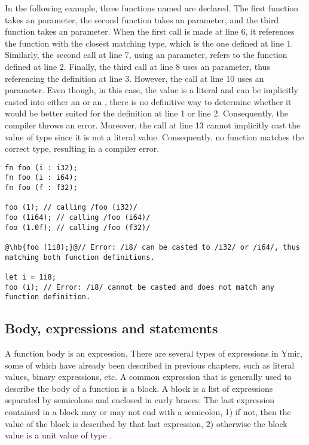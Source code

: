 In the following example, three functions named  are declared. The
first function takes an  parameter, the second function takes an
 parameter, and the third function takes an  parameter.
When the first call is made at line 6, it references the function with the
closest matching type, which is the one defined at line 1. Similarly, the second
call at line 7, using an  parameter, refers to the function defined
at line 2. Finally, the third call at line 8 uses an  parameter, thus
referencing the definition at line 3. However, the call at line 10 uses an
 parameter. Even though, in this case, the value is a literal and can
be implicitly casted into either an  or an , there is no
definitive way to determine whether it would be better suited for the definition
at line 1 or line 2. Consequently, the compiler throws an error. Moreover, the
call at line 13 cannot implicitly cast the value of type  since it is
not a literal value. Consequently, no function matches the correct type,
resulting in a compiler error.

\begin{lstlisting}[style=coloredverbatim, escapechar=@]
fn foo (i : i32);
fn foo (i : i64);
fn foo (f : f32);

foo (1); // calling /foo (i32)/
foo (1i64); // calling /foo (i64)/
foo (1.0f); // calling /foo (f32)/

@\hb{foo (1i8);}@// Error: /i8/ can be casted to /i32/ or /i64/, thus matching both function definitions.

let i = 1i8;
foo (i); // Error: /i8/ cannot be casted and does not match any function definition.
\end{lstlisting}

\subsection {Body, expressions and statements}
\label{sec:function_body}

A function body is an expression. There are several types of expressions in
Ymir, some of which have already been described in previous chapters, such as
literal values, binary expressions, etc. A common expression that is generally
used to describe the body of a function is a block. A block is a list of
expressions separated by semicolons and enclosed in curly braces. The last
expression contained in a block may or may not end with a semicolon, 1) if not,
then the value of the block is described by that last expression, 2) otherwise
the block value is a unit value of type .

